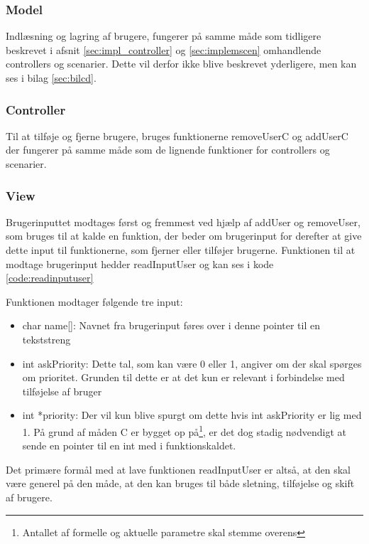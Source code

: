\subsubsection*{Model}
Indlæsning og lagring af brugere, fungerer på samme måde som tidligere beskrevet i afsnit \ref{sec:impl_controller} og \ref{sec:implemscen} omhandlende controllers og scenarier. Dette vil derfor ikke blive beskrevet yderligere, men kan ses i bilag \ref{sec:bilcd}. 

\subsubsection*{Controller}
Til at tilføje og fjerne brugere, bruges funktionerne removeUserC og addUserC der fungerer på samme måde som de lignende funktioner for controllers og scenarier.

\subsubsection*{View}\label{sec:users_view}

Brugerinputtet modtages først og fremmest ved hjælp af addUser og removeUser, som bruges til at kalde en funktion, der beder om brugerinput for derefter at give dette input til funktionerne, som fjerner eller tilføjer brugerne. Funktionen til at modtage brugerinput hedder readInputUser og kan ses i kode \ref{code:readinputuser}


Funktionen modtager følgende tre input:
\begin{itemize}
    \item char name[]: Navnet fra brugerinput føres over i denne pointer til en tekststreng
    \item int askPriority: Dette tal, som kan være 0 eller 1, angiver om der skal spørges om prioritet. Grunden til dette er at det kun er relevant i forbindelse med tilføjelse af bruger
    \item int *priority: Der vil kun blive spurgt om dette hvis int askPriority er lig med 1. På grund af måden C er bygget op på\footnote{Antallet af formelle og aktuelle parametre skal stemme overens}, er det dog stadig nødvendigt at sende en pointer til en int med i funktionskaldet.
\end{itemize}

Det primære formål med at lave funktionen readInputUser er altså, at den skal være generel på den måde, at den kan bruges til både sletning, tilføjelse og skift af brugere.\\


